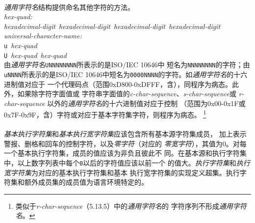 \paragraph{}
\textit{通用字符名}结构提供命名其他字符的方法。                               \\
\mbox{\qquad \textit{hex-quad:}}                                              \\
\mbox{\qquad \qquad \textit{hexadecimal-digit hexadecimal-digit
    hexadecimal-digit hexadecimal-digit}}                                     \\
\mbox{\qquad \textit{universal-character-name:}}                              \\
\mbox{\qquad \qquad \texttt{\bslh{}u} \textit{hex-quad}}                      \\
\mbox{\qquad \qquad \texttt{\bslh{}U} \textit{hex-quad}
    \textit{hex-quad}}                                                        \\
由\textit{通用字符名}\texttt{\bslh UNNNNNNNN}所表示的是ISO/IEC 10646中
短名为\texttt{NNNNNNNN}的字符；由\texttt{\bslh uNNNN}所表示的是ISO/IEC
10646中短名为\texttt{0000NNNN}的字符。如\textit{通用字符名}的十六进制值对应于
一个代理码点（范围0xD800-0xDFFF，含），同程序为病态。此外，如果除字符字面值或
字符串字面值的\textit{c-char-sequence}、\textit{s-char-sequence}或
\textit{r-char-sequence} 以外的\textit{通用字符名}的十六进制值对应于控制
（范围为0x00-0x1F或0x7F-0x9F，含）字符或对应于基本字符集字符，则程序为病态。
\footnote{类似于\textit{r-char-sequence}（5.13.5）中的\textit{通用字符名}的
字符序列不形成\textit{通用字符名}。}

\paragraph{}
\textit{基本执行字符集}和\textit{基本执行宽字符集}应该包含所有基本源字符集成员，
加上表示警报、删格和回车的控制字符，以及\textit{零字符}（对应的
\textit{零宽字符}），其值为0。对每一个基本执行字符集，成员的值应该为非负且彼此不
同。在基本源和执行字符集中，以上数字列表中每个\texttt{0}以后的字符值应该以前一个
的值大。\textit{执行字符集}和\textit{执行宽字符集}为对应的基本执行字符集和基本
执行宽字符集的实现定义超集。执行字符集和额外成员集的成员值为语言环境特定的。

